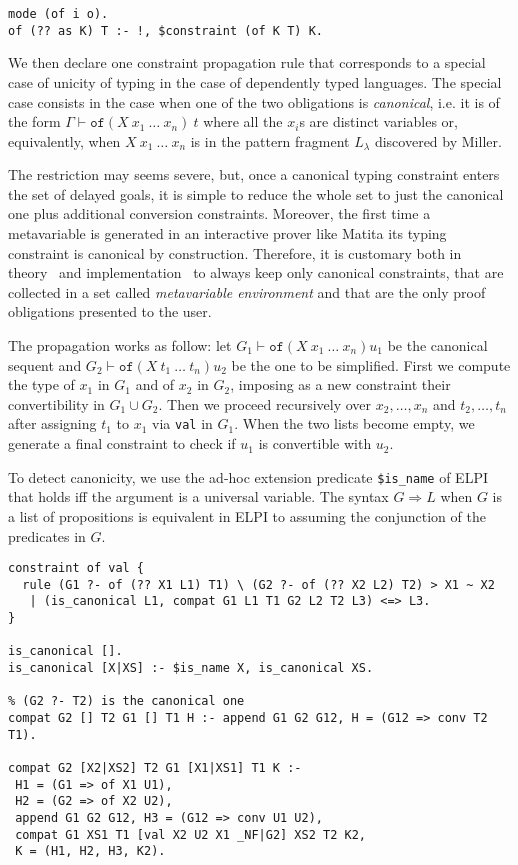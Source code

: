 \documentclass{easychair}
\begin{document}
\begin{verbatim}
mode (of i o).
of (?? as K) T :- !, $constraint (of K T) K.
\end{verbatim}

We then declare one constraint propagation rule that corresponds to a special case of unicity of typing in the case of dependently typed languages. The special case consists in the case when one of the two obligations is \emph{canonical}, i.e. it is of the form $\Gamma \vdash \mathtt{of} (X~x_1~\ldots~x_n)~t$ where all the $x_i$s are distinct variables or, equivalently, when $X~x_1~\ldots~x_n$ is in the pattern fragment $L_\lambda$ discovered by Miller.

The restriction may seems severe, but, once a canonical typing constraint enters the set of delayed goals, it is simple to reduce the whole set to just the canonical one plus additional conversion constraints. Moreover, the first time a metavariable is generated in an interactive prover like Matita its typing constraint is canonical by construction. Therefore, it is customary both in theory~\cite{jojgov} and implementation~\cite{bidir} to always keep only canonical constraints, that are collected in a set called \emph{metavariable environment} and that are the only proof obligations presented to the user.

The propagation works as follow: let $G_1 \vdash \mathtt{of} (X~x_1~\ldots~x_n) u_1$ be the canonical sequent and $G_2 \vdash \mathtt{of} (X~t_1~\ldots~t_n) u_2$ be the one to be simplified. First we compute the type of $x_1$ in $G_1$ and of $x_2$ in $G_2$, imposing as a new constraint their convertibility in $G_1 \cup G_2$. Then we proceed recursively over $x_2,\ldots,x_n$ and $t_2,\ldots,t_n$ after assigning $t_1$ to $x_1$ via \verb+val+ in $G_1$. When the two lists become empty, we generate a final constraint to check if $u_1$ is convertible with $u_2$.

To detect canonicity, we use the ad-hoc extension predicate \verb+$is_name+ of ELPI that holds iff the argument is a universal variable. The syntax $G \Rightarrow L$ when $G$ is a list of propositions is equivalent in ELPI to assuming the conjunction of the predicates in $G$.

\begin{verbatim}
constraint of val {
  rule (G1 ?- of (?? X1 L1) T1) \ (G2 ?- of (?? X2 L2) T2) > X1 ~ X2
   | (is_canonical L1, compat G1 L1 T1 G2 L2 T2 L3) <=> L3.
}

is_canonical [].
is_canonical [X|XS] :- $is_name X, is_canonical XS.

% (G2 ?- T2) is the canonical one
compat G2 [] T2 G1 [] T1 H :- append G1 G2 G12, H = (G12 => conv T2 T1).

compat G2 [X2|XS2] T2 G1 [X1|XS1] T1 K :-
 H1 = (G1 => of X1 U1),
 H2 = (G2 => of X2 U2),
 append G1 G2 G12, H3 = (G12 => conv U1 U2),
 compat G1 XS1 T1 [val X2 U2 X1 _NF|G2] XS2 T2 K2,
 K = (H1, H2, H3, K2).
\end{verbatim}
\end{document}
